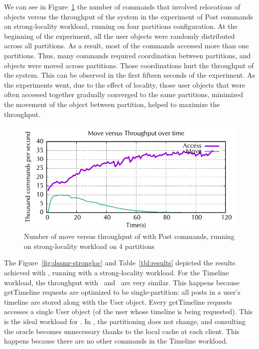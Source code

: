 We can see in Figure~\ref{fig:dssmr-move-vs-tp-strong} the number of commands that
involved relocations of objects versus the throughput of the system in the
experiment of Post commands on strong-locality workload, running on four
partitions configuration. At the beginning of the experiment, all the user
objects were randomly distributed across all partitions. As a result, most of the
commands accessed more than one partitions. Thus, many commands required
coordination between partitions, and objects were moved across partitions. Those
coordinations hurt the throughput of the system. This can be observed in the
first fifteen seconds of the experiment. As the experiments went, due to the
effect of locality, those user objects that were often accessed together
gradually converged to the same partitions, minimized the movement of the object
between partition, helped to maximize the throughput.


\begin{figure}[ht!]
\begin{minipage}[b]{1\linewidth}
\centering
      \includegraphics[width=0.6\linewidth]{figures/experiments/dssmr/move-vs-throughput}
\end{minipage}
\caption{Number of move versus throughput of \dynastar with Post commands, running on strong-locality workload on 4 partitions}
\label{fig:dssmr-move-vs-tp-strong}
\end{figure}


The Figure~\ref{fig:dssmr-strongloc} and Table~\ref{tbl:results} depicted the
results achieved with \dssmrappname{}, running with a strong-locality workload.
For the Timeline workload, the throughput with \dssmr\ and \ssmr\ are very
similar. This happens because getTimeline requests are optimized to be
single-partition: all posts in a user's timeline are stored along with the User
object. Every getTimeline requests accesses a single User object (of the user
whose timeline is being requested). This is the ideal workload for \ssmr{}. In
\dssmr{}, the partitioning does not change, and consulting the oracle becomes
unnecessary thanks to the local cache at each client. This happens because there
are no other commands in the Timeline workload.

